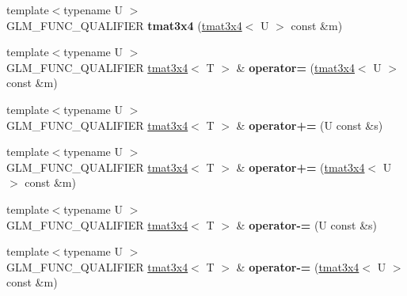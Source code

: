 \begin{DoxyCompactItemize}
\item 
\hypertarget{structglm_1_1detail_1_1tmat3x4_a80093e032a833f71909c1f1afcb983e8}{}{\footnotesize template$<$typename U $>$ }\\G\+L\+M\+\_\+\+F\+U\+N\+C\+\_\+\+Q\+U\+A\+L\+I\+F\+I\+E\+R {\bfseries tmat3x4} (\hyperlink{structglm_1_1detail_1_1tmat3x4}{tmat3x4}$<$ U $>$ const \&m)\label{structglm_1_1detail_1_1tmat3x4_a80093e032a833f71909c1f1afcb983e8}

\item 
\hypertarget{structglm_1_1detail_1_1tmat3x4_aea33b6347b51d023b31fbd9eba823352}{}{\footnotesize template$<$typename U $>$ }\\G\+L\+M\+\_\+\+F\+U\+N\+C\+\_\+\+Q\+U\+A\+L\+I\+F\+I\+E\+R \hyperlink{structglm_1_1detail_1_1tmat3x4}{tmat3x4}$<$ T $>$ \& {\bfseries operator=} (\hyperlink{structglm_1_1detail_1_1tmat3x4}{tmat3x4}$<$ U $>$ const \&m)\label{structglm_1_1detail_1_1tmat3x4_aea33b6347b51d023b31fbd9eba823352}

\item 
\hypertarget{structglm_1_1detail_1_1tmat3x4_a22f18b6c9ed1943b3ea9372eea494760}{}{\footnotesize template$<$typename U $>$ }\\G\+L\+M\+\_\+\+F\+U\+N\+C\+\_\+\+Q\+U\+A\+L\+I\+F\+I\+E\+R \hyperlink{structglm_1_1detail_1_1tmat3x4}{tmat3x4}$<$ T $>$ \& {\bfseries operator+=} (U const \&s)\label{structglm_1_1detail_1_1tmat3x4_a22f18b6c9ed1943b3ea9372eea494760}

\item 
\hypertarget{structglm_1_1detail_1_1tmat3x4_a9ea97b19c360acd8578ce5163d70650b}{}{\footnotesize template$<$typename U $>$ }\\G\+L\+M\+\_\+\+F\+U\+N\+C\+\_\+\+Q\+U\+A\+L\+I\+F\+I\+E\+R \hyperlink{structglm_1_1detail_1_1tmat3x4}{tmat3x4}$<$ T $>$ \& {\bfseries operator+=} (\hyperlink{structglm_1_1detail_1_1tmat3x4}{tmat3x4}$<$ U $>$ const \&m)\label{structglm_1_1detail_1_1tmat3x4_a9ea97b19c360acd8578ce5163d70650b}

\item 
\hypertarget{structglm_1_1detail_1_1tmat3x4_a95a1b1fd1e714017555d6b2be36018a7}{}{\footnotesize template$<$typename U $>$ }\\G\+L\+M\+\_\+\+F\+U\+N\+C\+\_\+\+Q\+U\+A\+L\+I\+F\+I\+E\+R \hyperlink{structglm_1_1detail_1_1tmat3x4}{tmat3x4}$<$ T $>$ \& {\bfseries operator-\/=} (U const \&s)\label{structglm_1_1detail_1_1tmat3x4_a95a1b1fd1e714017555d6b2be36018a7}

\item 
\hypertarget{structglm_1_1detail_1_1tmat3x4_a42ce41d4893b371e7222debdd86c3dd0}{}{\footnotesize template$<$typename U $>$ }\\G\+L\+M\+\_\+\+F\+U\+N\+C\+\_\+\+Q\+U\+A\+L\+I\+F\+I\+E\+R \hyperlink{structglm_1_1detail_1_1tmat3x4}{tmat3x4}$<$ T $>$ \& {\bfseries operator-\/=} (\hyperlink{structglm_1_1detail_1_1tmat3x4}{tmat3x4}$<$ U $>$ const \&m)\label{structglm_1_1detail_1_1tmat3x4_a42ce41d4893b371e7222debdd86c3dd0}


\end{DoxyCompactItemize}
